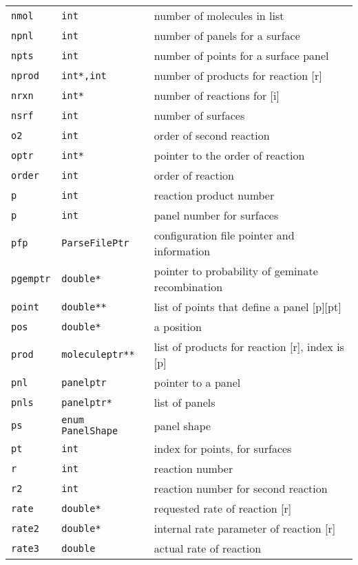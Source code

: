 \documentclass {book}
\begin{document}
\begin{longtable}[c]{lll}
\texttt{nmol} & \texttt{int} & number of molecules in list\\
\texttt{npnl} & \texttt{int} & number of panels for a surface\\
\texttt{npts} & \texttt{int} & number of points for a surface panel\\
\texttt{nprod} & \texttt{int*,int} & number of products for reaction [r]\\
\texttt{nrxn} & \texttt{int*} & number of reactions for [i]\\
\texttt{nsrf} & \texttt{int} & number of surfaces\\
\texttt{o2} & \texttt{int} & order of second reaction\\
\texttt{optr} & \texttt{int*} & pointer to the order of reaction\\
\texttt{order} & \texttt{int} & order of reaction\\
\texttt{p} & \texttt{int} & reaction product number\\
\texttt{p} & \texttt{int} & panel number for surfaces\\
\texttt{pfp} & \texttt{ParseFilePtr} & configuration file pointer and information\\
\texttt{pgemptr} & \texttt{double*} & pointer to probability of geminate recombination\\
\texttt{point} & \texttt{double**} & list of points that define a panel [p][pt]\\
\texttt{pos} & \texttt{double*} & a position\\
\texttt{prod} & \texttt{moleculeptr**} & list of products for reaction [r], index is [p]\\
\texttt{pnl} & \texttt{panelptr} & pointer to a panel\\
\texttt{pnls} & \texttt{panelptr*} & list of panels\\
\texttt{ps} & \texttt{enum PanelShape} & panel shape\\
\texttt{pt} & \texttt{int} & index for points, for surfaces\\
\texttt{r} & \texttt{int} & reaction number\\
\texttt{r2} & \texttt{int} & reaction number for second reaction\\
\texttt{rate} & \texttt{double*} & requested rate of reaction [r]\\
\texttt{rate2} & \texttt{double*} & internal rate parameter of reaction [r]\\
\texttt{rate3} & \texttt{double} & actual rate of reaction\\

\end{longtable}
\end{document}

